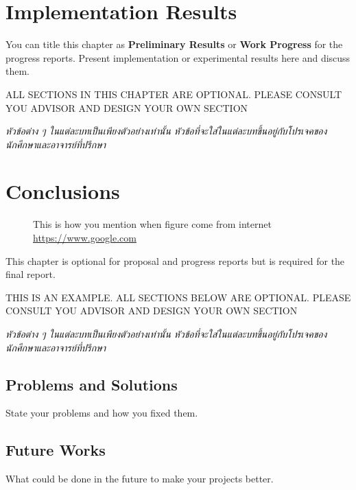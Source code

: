 \documentclass[12pt,oneside,openright,a4paper]{cpe-english-project}
\begin{document}
\chapter{Implementation Results}

You can title this chapter as \textbf{Preliminary Results} or \textbf{Work Progress} for the progress reports. Present implementation or experimental results here and discuss them.


ALL SECTIONS IN THIS CHAPTER ARE OPTIONAL. PLEASE CONSULT YOU ADVISOR AND DESIGN YOUR OWN SECTION

\emph{\textthai{หัวข้อต่าง ๆ ในแต่ละบทเป็นเพียงตัวอย่างเท่านั้น หัวข้อที่จะใส่ในแต่ละบทขึ้นอยู่กับโปรเจคของนักศึกษาและอาจารย์ที่ปรึกษา}}

\chapter{Conclusions}

 \begin{figure}[!h]
\caption{This is how you mention when figure come from internet  \href{https://www.google.com} {https://www.google.com}}\label{fig:x1}
\end{figure}

This chapter is optional for proposal and progress reports but 
is required for the final report.

THIS IS AN EXAMPLE. ALL SECTIONS BELOW ARE OPTIONAL. PLEASE CONSULT YOU ADVISOR AND DESIGN YOUR OWN SECTION

\emph{\textthai{หัวข้อต่าง ๆ ในแต่ละบทเป็นเพียงตัวอย่างเท่านั้น หัวข้อที่จะใส่ในแต่ละบทขึ้นอยู่กับโปรเจคของนักศึกษาและอาจารย์ที่ปรึกษา}}

\section{Problems and Solutions}
State your problems and how you fixed them.

\section{Future Works}
What could be done in the future to make your projects better.
\end{document}
